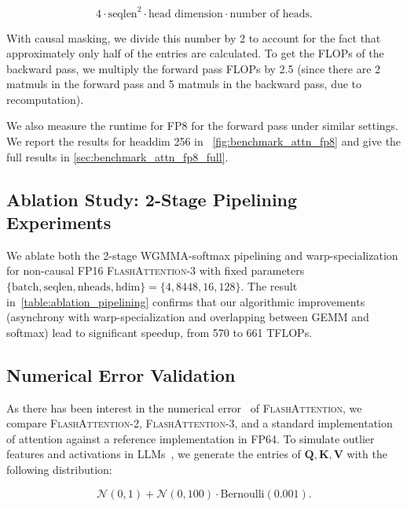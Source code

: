 \begin{equation*}
  4 \cdot \text{seqlen}^2 \cdot \text{head dimension} \cdot \text{number of heads}.
\end{equation*}

With causal masking, we divide this number by 2 to account for the fact that approximately only half of the entries are calculated. To get the FLOPs of the backward pass, we multiply the forward pass FLOPs by 2.5 (since there are 2 matmuls in the forward pass and 5 matmuls in the backward pass, due to recomputation).

We also measure the runtime for FP8 for the forward pass under similar settings. We report the results for headdim 256 in ~\cref{fig:benchmark_attn_fp8} and give the full results in \cref{sec:benchmark_attn_fp8_full}.

\subsection{Ablation Study: 2-Stage Pipelining Experiments}
\label{sec:2-stage-pipelining-experiments}

We ablate both the 2-stage WGMMA-softmax pipelining and warp-specialization for non-causal FP16 \textsc{FlashAttention-3} with fixed parameters $\{\text{batch}, \text{seqlen}, \text{nheads}, \text{hdim}\} = \{ 4, 8448, 16, 128\}$.
The result in~\cref{table:ablation_pipelining} confirms that our algorithmic improvements (asynchrony with warp-specialization and overlapping between GEMM and softmax) lead to significant speedup, from 570 to 661 TFLOPs.

\subsection{Numerical Error Validation}
\label{sec:numerical_error}

As there has been interest in the numerical error~\citep{golden2024flash} of
\textsc{FlashAttention}, we compare \textsc{FlashAttention-2}, \textsc{FlashAttention-3}, and a standard implementation of attention against a reference implementation in FP64. To simulate outlier features and activations in LLMs~\citep{dettmers2208llm,
  sun2024massive}, we generate the entries of $\mathbf{Q}, \mathbf{K}, \mathbf{V}$ with the following distribution:

\begin{equation*}
  \mathcal{N}(0, 1) + \mathcal{N}(0, 100) \cdot \mathrm{Bernoulli}(0.001).
\end{equation*}

